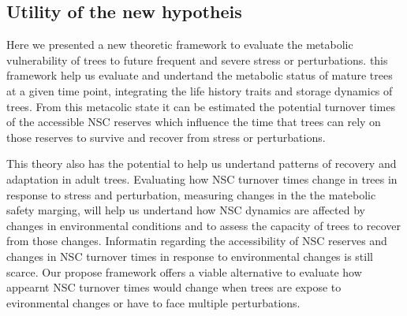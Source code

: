 \documentclass{article}
\begin{document}
%
%

\subsection{Utility of the new hypotheis}

Here we presented a new theoretic framework to evaluate the metabolic vulnerability of trees to future frequent and severe stress or perturbations. 
this framework help us evaluate and undertand the metabolic status of mature trees at a given time point, integrating the life history traits and storage dynamics of trees. 
From this metacolic state it can be estimated the potential turnover times of the accessible NSC reserves which influence the time that trees can rely on those reserves to survive and recover from stress or perturbations. 

This theory also has the potential to help us undertand patterns of recovery and adaptation in adult trees. 
Evaluating how NSC turnover times change in trees in response to stress and perturbation, measuring changes in the the matebolic safety marging, will help us undertand how NSC dynamics are affected by changes in environmental conditions and to assess the capacity of trees to recover from those changes. 
Informatin regarding the accessibility of NSC reserves and changes in NSC turnover times in response to environmental changes is still scarce. 
Our propose framework offers a viable alternative to evaluate how appearnt  NSC turnover times would change when trees are expose to evironmental changes or have to face multiple perturbations.  

%
\end{document}
